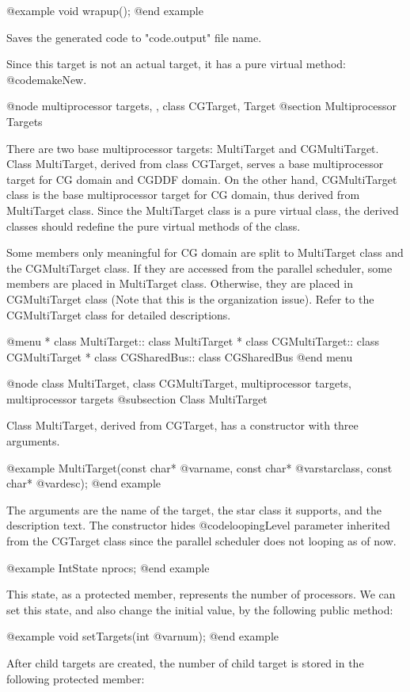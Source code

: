 @example
void wrapup();
@end example

Saves the generated code to "code.output" file name.

Since this target is not an actual target, it has a pure virtual method:
@code{makeNew}.

@node multiprocessor targets, , class CGTarget, Target
@section Multiprocessor Targets

There are two base multiprocessor targets: MultiTarget and CGMultiTarget.
Class MultiTarget, derived from class CGTarget, serves a base multiprocessor
target for CG domain and CGDDF domain. On the other hand, CGMultiTarget
class is the base multiprocessor target for CG domain, thus derived from
MultiTarget class. Since the MultiTarget class is a pure virtual class,
the derived classes should redefine the pure virtual methods of the class.

Some members only meaningful for CG domain are split to MultiTarget
class and the CGMultiTarget class. If they are accessed from the parallel
scheduler, some members are placed in MultiTarget class. Otherwise, they
are placed in CGMultiTarget class (Note that this is the organization issue).
Refer to the CGMultiTarget class for detailed descriptions.

@menu
* class MultiTarget::		class MultiTarget
* class CGMultiTarget::		class CGMultiTarget
* class CGSharedBus::		class CGSharedBus
@end menu

@node class MultiTarget, class CGMultiTarget, multiprocessor targets, multiprocessor targets
@subsection Class MultiTarget

Class MultiTarget, derived from CGTarget, has a constructor with three
arguments.

@example
MultiTarget(const char* @var{name}, const char* @var{starclass}, const char* @var{desc});
@end example

The arguments are the name of the target, the star class it supports, and the
description text. The constructor hides @code{loopingLevel} parameter
inherited from the CGTarget class since the parallel scheduler does not
looping as of now.

@example
IntState nprocs;
@end example

This state, as a protected member, represents the number of processors.
We can set this state, and also change the initial value, by the following 
public method:

@example
void setTargets(int @var{num});
@end example

After child targets are created, the number of child target is stored in
the following protected member:


